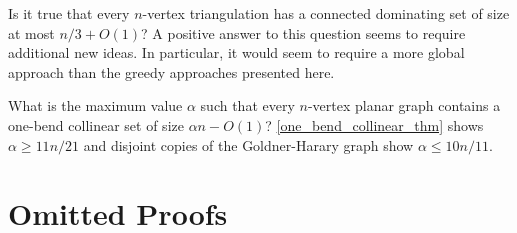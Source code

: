 \documentclass[a4paper,UKenglish,cleveref, autoref, thm-restate]{lipics-v2021}
\begin{document}
\begin{compactenum}
  \item Is it true that every $n$-vertex triangulation has a connected dominating set of size at most $n/3+O(1)$?  A positive answer to this question seems to require additional new ideas.  In particular, it would seem to require a more global approach than the greedy approaches presented here.

  \item What is the maximum value $\alpha$ such that every $n$-vertex planar graph contains a one-bend collinear set of size $\alpha n-O(1)$?  \cref{one_bend_collinear_thm} shows $\alpha \ge 11n/21$ and disjoint copies of the Goldner-Harary graph show $\alpha \le 10n/11$.



\end{compactenum}






\appendix

\section{Omitted Proofs}
\end{document}
